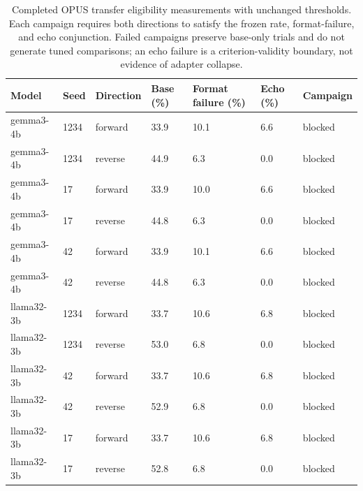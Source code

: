 \begin{table}[t]
\centering\small
\begin{tabular}{lllllll}
\toprule
Model & Seed & Direction & Base (\%) & Format failure (\%) & Echo (\%) & Campaign \\
\midrule
gemma3-4b & 1234 & forward & 33.9 & 10.1 & 6.6 & blocked \\
gemma3-4b & 1234 & reverse & 44.9 & 6.3 & 0.0 & blocked \\
gemma3-4b & 17 & forward & 33.9 & 10.0 & 6.6 & blocked \\
gemma3-4b & 17 & reverse & 44.8 & 6.3 & 0.0 & blocked \\
gemma3-4b & 42 & forward & 33.9 & 10.1 & 6.6 & blocked \\
gemma3-4b & 42 & reverse & 44.8 & 6.3 & 0.0 & blocked \\
llama32-3b & 1234 & forward & 33.7 & 10.6 & 6.8 & blocked \\
llama32-3b & 1234 & reverse & 53.0 & 6.8 & 0.0 & blocked \\
llama32-3b & 42 & forward & 33.7 & 10.6 & 6.8 & blocked \\
llama32-3b & 42 & reverse & 52.9 & 6.8 & 0.0 & blocked \\
llama32-3b & 17 & forward & 33.7 & 10.6 & 6.8 & blocked \\
llama32-3b & 17 & reverse & 52.8 & 6.8 & 0.0 & blocked \\
\bottomrule
\end{tabular}
\caption{Completed OPUS transfer eligibility measurements with unchanged thresholds. Each campaign requires both directions to satisfy the frozen rate, format-failure, and echo conjunction. Failed campaigns preserve base-only trials and do not generate tuned comparisons; an echo failure is a criterion-validity boundary, not evidence of adapter collapse.}
\label{tab:transfer-boundaries}
\end{table}
